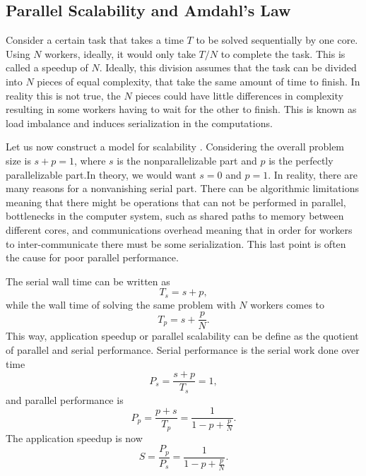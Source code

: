\subsection{Parallel Scalability and Amdahl's Law}

	Consider a certain task that takes a time $T$ to be solved sequentially by one core. Using $N$ workers, ideally, it would only take $T / N$ to complete the task. This is called a speedup of $N$. Ideally, this division assumes that the task can be divided into $N$ pieces of equal complexity, that take the same amount of time to finish. In reality this is not true, the $N$ pieces could have little differences in complexity resulting in some workers having to wait for the other to finish. This is known as load imbalance and induces serialization in the computations.
	
	Let us now construct a model for scalability \cite{Hager2011}. Considering the overall problem size is $s + p = 1$, where $s$ is the nonparallelizable part and $p$ is the perfectly parallelizable part.In theory, we would want $s=0$ and $p=1$. In reality, there are many reasons for a nonvanishing serial part. There can be algorithmic limitations meaning that there might be operations that can not be performed in parallel, bottlenecks in the computer system, such as shared paths to memory between different cores, and communications overhead meaning that in order for workers to inter-communicate there must be some serialization. This last point is often the cause for poor parallel performance. 
		
	The serial wall time can be written as
\begin{equation}
	T_s = s + p,
\end{equation}	
while the wall time of solving the same problem with $N$ workers comes to
\begin{equation}
	T_p = s + \frac{p}{N}.
\end{equation}
This way, application speedup or parallel scalability can be define as the quotient of parallel and serial performance. Serial performance is the serial work done over time
\begin{equation}
	P_s = \frac{s+p}{T_s} = 1,
\end{equation} 
and parallel performance is
\begin{equation}
	P_p = \frac{p+s}{T_p} = \frac{1}{1-p+\frac{p}{N}}.
\end{equation}
The application speedup is now
\begin{equation}\label{amd_law}
	S = \frac{P_p}{P_s} = \frac{1}{1-p+\frac{p}{N}}.
\end{equation}

